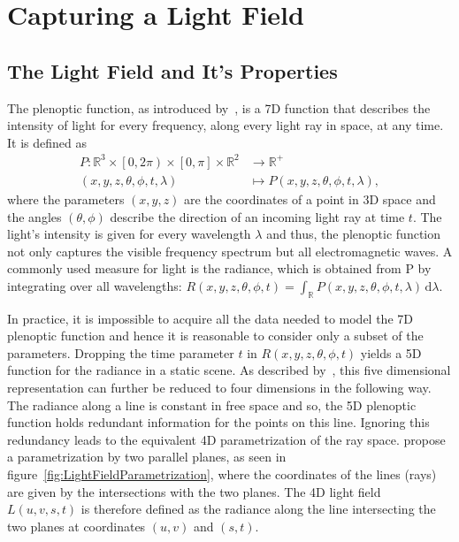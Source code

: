 \chapter{Capturing a Light Field}

\section{The Light Field and It's Properties}

The plenoptic function, as introduced by~\cite{AdelsonBergen}, is a 7D function that describes the intensity of light for every frequency, along every light ray in space, at any time. 
It is defined as
\begin{align*}
	P \colon \mathbb{R}^3 \times \left[0, 2 \pi \right) \times \left[ 0, \pi \right] \times \mathbb{R}^2 & \to \mathbb{R}^+ \\
	\left(x, y, z, \theta, \phi, t, \lambda \right) & \mapsto P\left(x, y, z, \theta, \phi, t, \lambda \right), 
\end{align*}
where the parameters $\left(x, y, z\right)$ are the coordinates of a point in 3D space and the angles $\left(\theta, \phi \right)$ describe the direction of an incoming light ray at time $t$. 
The light's intensity is given for every wavelength $\lambda$ and thus, the plenoptic function not only captures the visible frequency spectrum but all electromagnetic waves. 
A commonly used measure for light is the radiance, which is obtained from P by integrating over all wavelengths: 
$R\left(x, y, z, \theta, \phi, t\right) = \int_{\mathbb{R}} \! P\left(x, y, z, \theta, \phi, t, \lambda \right) \, \mathrm{d} \lambda$.

In practice, it is impossible to acquire all the data needed to model the 7D plenoptic function and hence it is reasonable to consider only a subset of the parameters. 
Dropping the time parameter $t$ in $R\left( x, y, z, \theta, \phi, t \right) $ yields a 5D function for the radiance in a static scene. 
As described by~\cite{LightFieldRendering}, this five dimensional representation can further be reduced to four dimensions in the following way. 
The radiance along a line is constant in free space and so, the 5D plenoptic function holds redundant information for the points on this line. 
Ignoring this redundancy leads to the equivalent 4D parametrization of the ray space. 
\cite{LightFieldRendering} propose a parametrization by two parallel planes, as seen in figure~\ref{fig:LightFieldParametrization}, where the coordinates of the lines (rays) are given by the intersections with the two planes.
The 4D light field $L(u, v, s, t)$ is therefore defined as the radiance along the line intersecting the two planes at coordinates $(u, v)$ and $(s, t)$.



